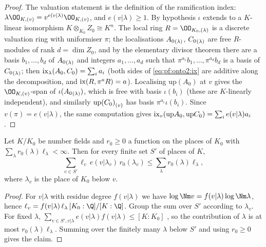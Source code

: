 \begin{proof}
The valuation statement is the definition of the ramification index: $\lambda\OO_{K,(v)}=v^{e(v|\lambda)}\OO_{K,(v)}$, and
$e(v|\lambda)\ge1$. By hypothesis $\iota$ extends to a $K$-linear isomorphism $K\otimes_{K_0}Z_0\cong K^n$. The local ring
$R=\OO_{K_0,(\lambda)}$ is a discrete valuation ring with uniformiser $\pi$; the localisations $\ontoIIloc{\lambda}{A_0}$,
$\ontoIIloc{\lambda}{C_0}$ are free $R$-modules of rank $d=\dim Z_0$, and by the elementary divisor theorem there are a basis
$b_1,\dots,b_d$ of $\ontoIIloc\lambda{A_0}$ and integers $a_1,\dots,a_d$ such that $\pi^{a_1}b_1,\dots,\pi^{a_d}b_d$ is a basis of
$\ontoIIloc\lambda{C_0}$; then $\ontoIIix_\lambda(A_0,C_0)=\sum_ia_i$ (both sides of \eqref{eq:pf:onto2:ix} are additive along the
decomposition, and $\ontoIIix(R,\pi^aR)=a$). Localising $\mathrm{up}(A_0)$ at $v$ gives the $\OO_{K,(v)}$-span of
$\iota(\ontoIIloc\lambda{A_0})$, which is free with basis $\iota(b_i)$ (these are $K$-linearly independent), and similarly
$\ontoIIloc{v}{\mathrm{up}(C_0)}$ has basis $\pi^{a_i}\iota(b_i)$. Since $v(\pi)=e(v|\lambda)$, the same computation gives
$\ontoIIix_v(\mathrm{up}A_0,\mathrm{up}C_0)=\sum_ie(v|\lambda)a_i$.
\end{proof}

\begin{lemma}\label{pf:onto2:l4}
Let $K/K_0$ be number fields and $r_0\ge0$ a function on the places of $K_0$ with $\sum_\lambda r_0(\lambda)\ell_\lambda<\infty$. Then
for every finite set $S'$ of places of $K$,
\[
\sum_{v\in S'}\ell_v\,e(v|\lambda_v)\,r_0(\lambda_v)\le\sum_\lambda r_0(\lambda)\ell_\lambda ,
\]
where $\lambda_v$ is the place of $K_0$ below $v$.
\end{lemma}

\begin{proof}
For $v|\lambda$ with residue degree $f(v|\lambda)$ we have $\log\Nm v=f(v|\lambda)\log\Nm\lambda$, hence
$\ell_v=f(v|\lambda)\,\ell_\lambda\,[K_0:\Q]/[K:\Q]$. Group the sum over $S'$ according to $\lambda_v$. For fixed $\lambda$,
$\sum_{v\in S',v|\lambda}e(v|\lambda)f(v|\lambda)\le[K:K_0]$ \cite[Prop.~I.8.2]{Neukirch1999}, so the contribution of $\lambda$ is at
most $r_0(\lambda)\ell_\lambda$. Summing over the finitely many $\lambda$ below $S'$ and using $r_0\ge0$ gives the claim.
\end{proof}

